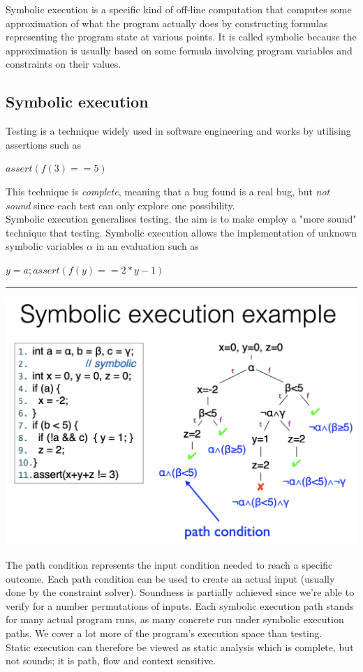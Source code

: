 \documentclass[11pt, oneside]{article}   	%
\begin{document}
Symbolic execution is a specific kind of off-line computation that computes some approximation of what the program actually does by constructing formulas representing the program state at various points. It is called symbolic because the approximation is usually based on some formula involving program variables and constraints on their values.\\
\subsection*{Symbolic execution}
Testing is a technique widely used in software engineering and works by utilising assertions such as \begin{center}
$assert(f(3) == 5)$\end{center}
This technique is \emph{complete}, meaning that a bug found is a real bug, but \emph{not sound} since each test can only explore one possibility.\\
Symbolic execution generalises testing, the aim is to make employ a "more sound" technique that testing. Symbolic execution allows the implementation of unknown symbolic variables $\alpha$ in an evaluation such as\begin{center}
$y = a; assert(f(y) == 2* y-1)$\\
\noindent\rule{8cm}{0.4pt}
\includegraphics[scale = 0.4]{dov2}
\end{center}
The path condition represents the input condition needed to reach a specific outcome. Each path condition can be used to create an actual input (usually done by the constraint solver). Soundness is partially achieved since we're able to verify for a number permutations of inputs. Each symbolic execution path stands for many actual program runs, as many concrete run under symbolic execution paths. We cover a lot more of the program's execution space than testing. \\
Static execution can therefore be viewed as static analysis which is complete, but not sounds; it is path, flow and context sensitive.
\end{document}
